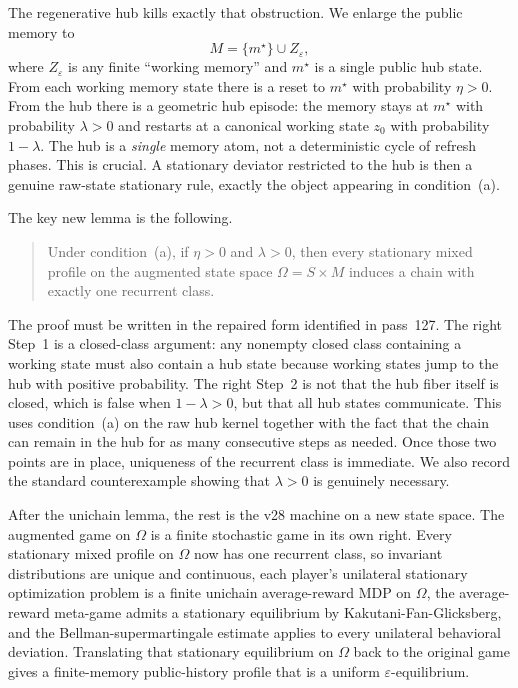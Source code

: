 \documentclass[11pt]{article}
\theoremstyle{definition}
\newcommand{\1}{\mathbf{1}}
\begin{document}
The regenerative hub kills exactly that obstruction. We enlarge the public memory to
\[
M=\{m^\star\}\cup Z_\varepsilon,
\]
where $Z_\varepsilon$ is any finite ``working memory'' and $m^\star$ is a single public hub state. From each working memory state there is a reset to $m^\star$ with probability $\eta>0$. From the hub there is a geometric hub episode: the memory stays at $m^\star$ with probability $\lambda>0$ and restarts at a canonical working state $z_0$ with probability $1-\lambda$. The hub is a \emph{single} memory atom, not a deterministic cycle of refresh phases. This is crucial. A stationary deviator restricted to the hub is then a genuine raw-state stationary rule, exactly the object appearing in condition~(a).

The key new lemma is the following.
\begin{quote}
Under condition~(a), if $\eta>0$ and $\lambda>0$, then every stationary mixed profile on the augmented state space $\Omega=S\times M$ induces a chain with exactly one recurrent class.
\end{quote}
The proof must be written in the repaired form identified in pass~127. The right Step~1 is a closed-class argument: any nonempty closed class containing a working state must also contain a hub state because working states jump to the hub with positive probability. The right Step~2 is not that the hub fiber itself is closed, which is false when $1-\lambda>0$, but that all hub states communicate. This uses condition~(a) on the raw hub kernel together with the fact that the chain can remain in the hub for as many consecutive steps as needed. Once those two points are in place, uniqueness of the recurrent class is immediate. We also record the standard counterexample showing that $\lambda>0$ is genuinely necessary.

After the unichain lemma, the rest is the v28 machine on a new state space. The augmented game on $\Omega$ is a finite stochastic game in its own right. Every stationary mixed profile on $\Omega$ now has one recurrent class, so invariant distributions are unique and continuous, each player's unilateral stationary optimization problem is a finite unichain average-reward MDP on $\Omega$, the average-reward meta-game admits a stationary equilibrium by Kakutani-Fan-Glicksberg, and the Bellman-supermartingale estimate applies to every unilateral behavioral deviation. Translating that stationary equilibrium on $\Omega$ back to the original game gives a finite-memory public-history profile that is a uniform $\varepsilon$-equilibrium.
\end{document}

